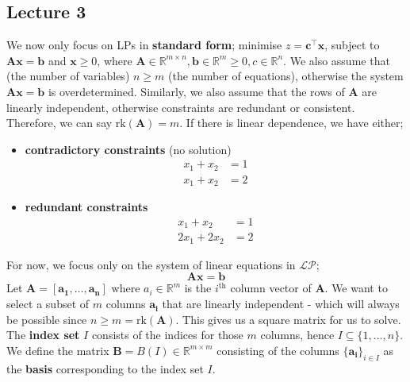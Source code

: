 \documentclass[a4paper, 12pt]{article}
\newcommand{\mat}[1]{\boldsymbol{#1}}
\renewcommand{\vec}[1]{\boldsymbol{#1}}
\begin{document}
        \subsection*{Lecture 3}
            We now only focus on LPs in \textbf{standard form};
            minimise $z = \vec{c}^\top\vec{x}$, subject to $\mat{A}\vec{x} = \vec{b}$ and $\vec{x} \geq 0$, where $\mat{A} \in \mathbb{R}^{m \times n}, \vec{b} \in \mathbb{R}^m \geq 0, c \in \mathbb{R}^n$.
            We also assume that (the number of variables) $n \geq m$ (the number of equations), otherwise the system $\mat{A}\vec{x} = \vec{b}$ is overdetermined.
            Similarly, we also assume that the rows of $\mat{A}$ are linearly independent, otherwise constraints are redundant or consistent.
            Therefore, we can say $\text{rk}(\mat{A}) = m$.
            If there is linear dependence, we have either;
            \begin{itemize}
                \itemsep0em
                \item \textbf{contradictory constraints} (no solution)
                    \begin{align*}
                        x_1 + x_2 & = 1 \\
                        x_1 + x_2 & = 2
                    \end{align*}
                \item \textbf{redundant constraints}
                    \begin{align*}
                        x_1 + x_2 & = 1 \\
                        2x_1 + 2x_2 & = 2
                    \end{align*}
            \end{itemize}
            For now, we focus only on the system of linear equations in $\mathcal{LP}$;
            $$\mat{A}\vec{x} = \vec{b}$$
            Let $\mat{A} = [\vec{a_1}, \dots, \vec{a_n}]$ where $a_i \in \mathbb{R}^m$ is the $i^\text{th}$ column vector of $\mat{A}$.
            We want to select a subset of $m$ columns $\vec{a_i}$ that are linearly independent - which will always be possible since $n \geq m = \text{rk}(\mat{A})$.
            This gives us a square matrix for us to solve.
            The \textbf{index set} $I$ consists of the indices for those $m$ columns, hence $I \subseteq \{1, \dots, n\}$.
            We define the matrix $\mat{B} = B(I) \in \mathbb{R}^{m \times m}$ consisting of the columns $\{\vec{a_i}\}_{i \in I}$ as the \textbf{basis} corresponding to the index set $I$.
            \medskip
\end{document}
